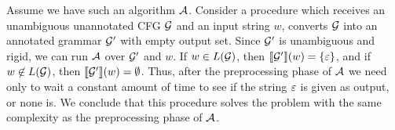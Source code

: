 
Assume we have such an algorithm $\mathcal{A}$. Consider a procedure which receives an unambiguous unannotated CFG $\mathcal{G}$ and an input string $w$, converts $\mathcal{G}$ into an annotated grammar $\mathcal{G}'$ with empty output set. Since $\mathcal{G}'$ is unambiguous and rigid, we can run $\mathcal{A}$ over $\mathcal{G}'$ and $w$. If $w\in L(\mathcal{G})$, then ${\llbracket{\mathcal{G}'}\rrbracket}(w) = \{\varepsilon\}$, and if $w\not\in L(\mathcal{G})$, then ${\llbracket{\mathcal{G}'}\rrbracket}(w) = \emptyset$. Thus, after the preprocessing phase of $\mathcal{A}$ we need only to wait a constant amount of time to see if the string $\varepsilon$ is given as output, or none is. We conclude that this procedure solves the problem with the same complexity as the preprocessing phase of $\mathcal{A}$.
